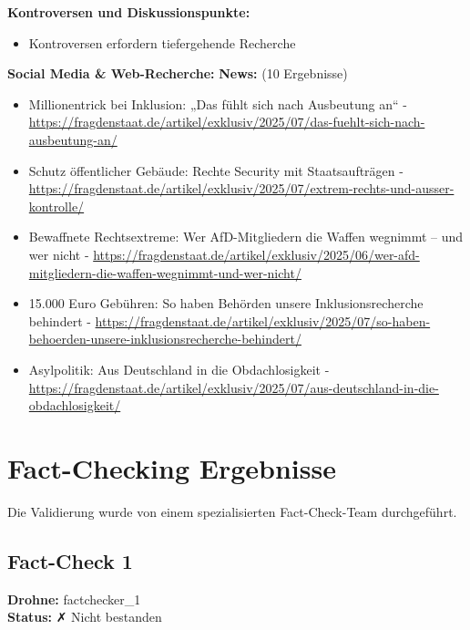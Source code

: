 \documentclass[12pt,a4paper]{article}
\begin{document}
\textbf{Kontroversen und Diskussionspunkte:}
\begin{itemize}
\item Kontroversen erfordern tiefergehende Recherche
\end{itemize}

\textbf{Social Media \& Web-Recherche:}
\textbf{News:} (10 Ergebnisse)
\begin{itemize}
\item Millionentrick bei Inklusion: „Das fühlt sich nach Ausbeutung an“ - \url{https://fragdenstaat.de/artikel/exklusiv/2025/07/das-fuehlt-sich-nach-ausbeutung-an/}
\item Schutz öffentlicher Gebäude: Rechte Security mit Staatsaufträgen - \url{https://fragdenstaat.de/artikel/exklusiv/2025/07/extrem-rechts-und-ausser-kontrolle/}
\item Bewaffnete Rechtsextreme: Wer AfD-Mitgliedern die Waffen wegnimmt – und wer nicht - \url{https://fragdenstaat.de/artikel/exklusiv/2025/06/wer-afd-mitgliedern-die-waffen-wegnimmt-und-wer-nicht/}
\item 15.000 Euro Gebühren: So haben Behörden unsere Inklusionsrecherche behindert - \url{https://fragdenstaat.de/artikel/exklusiv/2025/07/so-haben-behoerden-unsere-inklusionsrecherche-behindert/}
\item Asylpolitik: Aus Deutschland in die Obdachlosigkeit - \url{https://fragdenstaat.de/artikel/exklusiv/2025/07/aus-deutschland-in-die-obdachlosigkeit/}
\end{itemize}


\newpage
\section{Fact-Checking Ergebnisse}

Die Validierung wurde von einem spezialisierten Fact-Check-Team durchgeführt.


\subsection{Fact-Check 1}

\textbf{Drohne:} factchecker\_1\\
\textbf{Status:} ✗ Nicht bestanden\\
\end{document}
